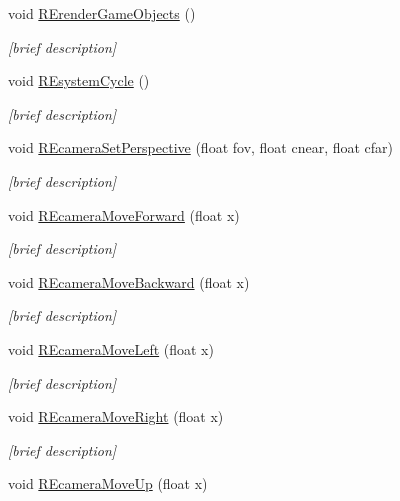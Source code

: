 \begin{DoxyCompactItemize}
void \hyperlink{class_i_s_e_a50d1bef6e0184967784e1e854c69abe6}{R\-Erender\-Game\-Objects} ()
\begin{DoxyCompactList}\small\item\em \mbox{[}brief description\mbox{]} \end{DoxyCompactList}\item 
void \hyperlink{class_i_s_e_a1860069b186938d3075caad0d9049e2b}{R\-Esystem\-Cycle} ()
\begin{DoxyCompactList}\small\item\em \mbox{[}brief description\mbox{]} \end{DoxyCompactList}\item 
void \hyperlink{class_i_s_e_a48d5364292ea4e39c0b49f25c0ee6338}{R\-Ecamera\-Set\-Perspective} (float fov, float cnear, float cfar)
\begin{DoxyCompactList}\small\item\em \mbox{[}brief description\mbox{]} \end{DoxyCompactList}\item 
void \hyperlink{class_i_s_e_a4dc3bb36f0e4ce0e317838b9104f51b9}{R\-Ecamera\-Move\-Forward} (float x)
\begin{DoxyCompactList}\small\item\em \mbox{[}brief description\mbox{]} \end{DoxyCompactList}\item 
void \hyperlink{class_i_s_e_a78c36080045f23df6aa612bf56166c51}{R\-Ecamera\-Move\-Backward} (float x)
\begin{DoxyCompactList}\small\item\em \mbox{[}brief description\mbox{]} \end{DoxyCompactList}\item 
void \hyperlink{class_i_s_e_adbad68f681d707bab79722714d259c8b}{R\-Ecamera\-Move\-Left} (float x)
\begin{DoxyCompactList}\small\item\em \mbox{[}brief description\mbox{]} \end{DoxyCompactList}\item 
void \hyperlink{class_i_s_e_a7c8671deaa658b729581366dd8c6e52e}{R\-Ecamera\-Move\-Right} (float x)
\begin{DoxyCompactList}\small\item\em \mbox{[}brief description\mbox{]} \end{DoxyCompactList}\item 
void \hyperlink{class_i_s_e_a569076f9c5287ca8be6643d2ca88570c}{R\-Ecamera\-Move\-Up} (float x)

\end{DoxyCompactItemize}
